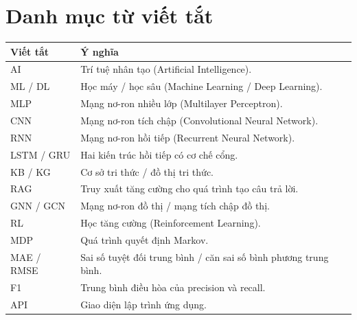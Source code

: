\chapter*{Danh mục từ viết tắt}
\begin{longtable}{p{2cm}p{11cm}}\toprule Viết tắt & Ý nghĩa\\\midrule
AI & Trí tuệ nhân tạo (Artificial Intelligence).\\
ML / DL & Học máy / học sâu (Machine Learning / Deep Learning).\\
MLP & Mạng nơ-ron nhiều lớp (Multilayer Perceptron).\\
CNN & Mạng nơ-ron tích chập (Convolutional Neural Network).\\
RNN & Mạng nơ-ron hồi tiếp (Recurrent Neural Network).\\
LSTM / GRU & Hai kiến trúc hồi tiếp có cơ chế cổng.\\
KB / KG & Cơ sở tri thức / đồ thị tri thức.\\
RAG & Truy xuất tăng cường cho quá trình tạo câu trả lời.\\
GNN / GCN & Mạng nơ-ron đồ thị / mạng tích chập đồ thị.\\
RL & Học tăng cường (Reinforcement Learning).\\
MDP & Quá trình quyết định Markov.\\
MAE / RMSE & Sai số tuyệt đối trung bình / căn sai số bình phương trung bình.\\
F1 & Trung bình điều hòa của precision và recall.\\
API & Giao diện lập trình ứng dụng.\\\bottomrule\end{longtable}
